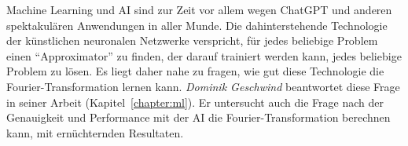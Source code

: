 Machine Learning und AI sind zur Zeit vor allem wegen ChatGPT und anderen
spektakulären Anwendungen in aller Munde.
%
Die dahinterstehende Technologie der künstlichen neuronalen Netzwerke
verspricht, für jedes beliebige Problem einen ``Approximator'' zu finden,
der darauf trainiert werden kann, jedes beliebige Problem zu lösen.
Es liegt daher nahe zu fragen, wie gut diese Technologie die
Fourier-Transformation lernen kann.
{\em Dominik Geschwind} beantwortet diese Frage in seiner Arbeit
%
(Kapitel~\ref{chapter:ml}).
Er untersucht auch die Frage nach der Genauigkeit und Performance mit der
AI die Fourier-Transformation berechnen kann, mit ernüchternden Resultaten.







